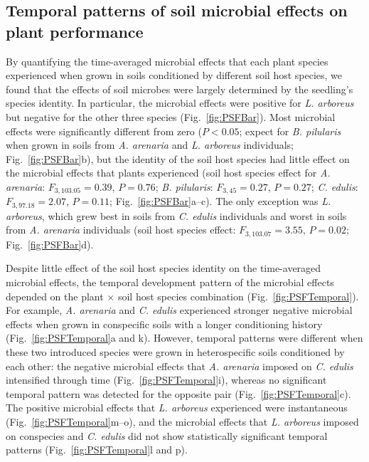 \subsection*{Temporal patterns of soil microbial effects on plant performance}
By quantifying the time-averaged microbial effects that each plant species experienced when grown in soils conditioned by different soil host species, we found that the effects of soil microbes were largely determined by the seedling's species identity.
In particular, the microbial effects were positive for \textit{L. arboreus} but negative for the other three species (Fig.~\ref{fig:PSFBar}). 
Most microbial effects were significantly different from zero ($P<0.05$; expect for \textit{B. pilularis} when grown in soils from \textit{A. arenaria} and \textit{L. arboreus} individuals; Fig.~\ref{fig:PSFBar}b), but the identity of the soil host species had little effect on the microbial effects that plants experienced (soil host species effect for \textit{A. arenaria}: $F_{3, 103.05}=0.39$, $P=0.76$; \textit{B. pilularis}: $F_{3, 45}=0.27$, $P=0.27$; \textit{C. edulis}: $F_{3, 97.18}=2.07$, $P=0.11$; Fig.~\ref{fig:PSFBar}a--c). The only exception was \textit{L. arboreus}, which grew best in soils from \textit{C. edulis} individuals and worst in soils from \textit{A. arenaria} individuals (soil host species effect: $F_{3, 103.07}=3.55$, $P=0.02$; Fig.~\ref{fig:PSFBar}d).
\par


Despite little effect of the soil host species identity on the time-averaged microbial effects, the temporal development pattern of the microbial effects depended on the plant $\times$ soil host species combination (Fig.~\ref{fig:PSFTemporal}). 
For example, \textit{A. arenaria} and \textit{C. edulis} experienced stronger negative microbial effects when grown in conspecific soils with a longer conditioning history (Fig.~\ref{fig:PSFTemporal}a and k). However, temporal patterns were different when these two introduced species were grown in heterospecific soils conditioned by each other: the negative microbial effects that \textit{A. arenaria} imposed on \textit{C. edulis} intensified through time (Fig.~\ref{fig:PSFTemporal}i), whereas no significant temporal pattern was detected for the opposite pair (Fig.~\ref{fig:PSFTemporal}c).
The positive microbial effects that \textit{L. arboreus} experienced were instantaneous (Fig.~\ref{fig:PSFTemporal}m--o), and the microbial effects that \textit{L. arboreus} imposed on conspecies and \textit{C. edulis} did not show statistically significant temporal patterns (Fig.~\ref{fig:PSFTemporal}l and p).
\par



